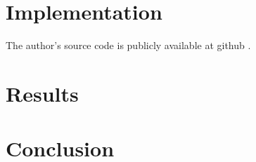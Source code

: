 \documentclass{birkjour}
\numberwithin{equation}{section}
\begin{document}
\section{Implementation}

The author's source code is publicly available at github \cite{GALinearizedArap}.

\section{Results}

\section{Conclusion}







\end{document}
